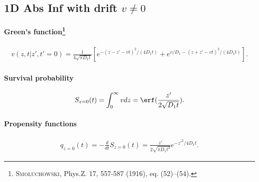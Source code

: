 
\subsection{1D Abs Inf with drift $v\neq 0$}

\paragraph{Green's function\footnote{\textsc{Smoluchowski}, Phys.Z. 17, 557-587 (1916), eq. (52)--(54).}}
\begin{align}
  v(z,t|z',t'=0) = \frac{1}{4\sqrt{\pi D_1t}}
  \left[ e^{-(z-z'-vt)^2/(4 D_1 t)} + e^{v/D_1-(z+z'-vt)^2/(4 D_1 t)} \right].
\end{align}

\paragraph{Survival probability}
\begin{align}
  S_{z=0}(t) = \int_0^\infty v dz =
  \erf(\frac{z'}{2\sqrt{D_1 t}}).
\end{align}

\paragraph{Propensity functions}
\begin{align}
  q_{z=0}(t) = -\frac{d}{dt} S_{z=0}(t)=
  \frac{z'}{2\sqrt{\pi D_1 t^3}} e^{-z'^2/4D_1t}.
\end{align}

